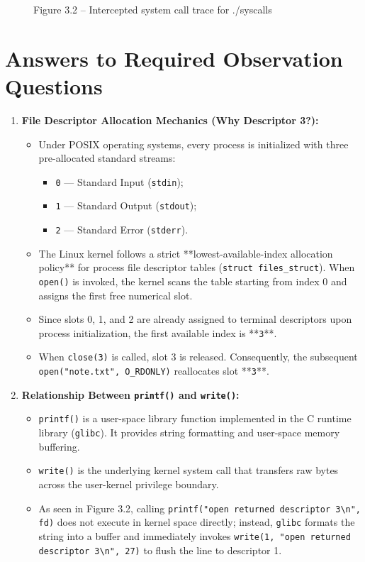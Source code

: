 \documentclass[12pt,a4paper]{report}
\numberwithin{equation}{chapter}
\numberwithin{figure}{chapter}
\numberwithin{table}{chapter}
\begin{document}
\begin{figure}[H]
\centering
\caption{Figure 3.2 -- Intercepted system call trace for ./syscalls}
\end{figure}

\section{Answers to Required Observation Questions}
\begin{enumerate}
    \item \textbf{File Descriptor Allocation Mechanics (Why Descriptor 3?):}
    \begin{itemize}
        \item Under POSIX operating systems, every process is initialized with three pre-allocated standard streams:
        \begin{itemize}
            \item \texttt{0} --- Standard Input (\texttt{stdin});
            \item \texttt{1} --- Standard Output (\texttt{stdout});
            \item \texttt{2} --- Standard Error (\texttt{stderr}).
        \end{itemize}
        \item The Linux kernel follows a strict **lowest-available-index allocation policy** for process file descriptor tables (\texttt{struct files\_struct}). When \texttt{open()} is invoked, the kernel scans the table starting from index 0 and assigns the first free numerical slot.
        \item Since slots 0, 1, and 2 are already assigned to terminal descriptors upon process initialization, the first available index is **\texttt{3}**.
        \item When \texttt{close(3)} is called, slot 3 is released. Consequently, the subsequent \texttt{open("note.txt", O\_RDONLY)} reallocates slot **\texttt{3}**.
    \end{itemize}

    \item \textbf{Relationship Between \texttt{printf()} and \texttt{write()}:}
    \begin{itemize}
        \item \texttt{printf()} is a user-space library function implemented in the C runtime library (\texttt{glibc}). It provides string formatting and user-space memory buffering.
        \item \texttt{write()} is the underlying kernel system call that transfers raw bytes across the user-kernel privilege boundary.
        \item As seen in Figure 3.2, calling \texttt{printf("open returned descriptor 3\textbackslash n", fd)} does not execute in kernel space directly; instead, \texttt{glibc} formats the string into a buffer and immediately invokes \texttt{write(1, "open returned descriptor 3\textbackslash n", 27)} to flush the line to descriptor 1.
    \end{itemize}
\end{enumerate}
\end{document}
